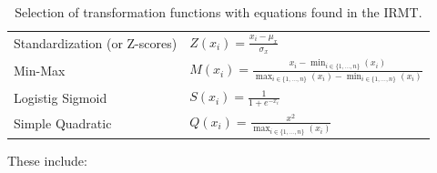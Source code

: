 \begin{table}
\centering
\caption{Selection of transformation functions with equations found in the IRMT.}
\label{tab:transformation_functions}
\begin{tabular}{ll}
Standardization (or Z-scores) & $ Z(x_i) = \frac{x_i-\mu_x}{\sigma_x} $ \\
Min-Max & $ M(x_i) = \frac{x_i - \min_{i \in \{1,\dots,n\}}(x_i)}{\max_{i \in \{1,\dots,n\}}(x_i) - \min_{i \in \{1,\dots,n\}}(x_i)} $\\
Logistig Sigmoid & $ S(x_i) = \frac{1}{1 + e^{-x_i}} $ \\
Simple Quadratic & $ Q(x_i) = \frac{x^2}{\max_{i \in \{1,\dots,n\}}(x_i)} $
\end{tabular}
\end{table}

These include:
